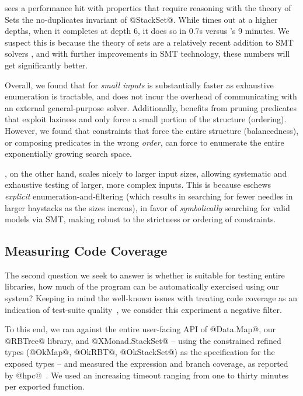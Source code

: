 \toolname sees a performance hit with properties 
that require reasoning with the theory of Sets \eg 
the no-duplicates invariant of @StackSet@. 
%
While \lazysmallcheck times out at a higher depths, when it completes
\eg at depth 6, it does so in 0.7s versus \toolname's 9 minutes.
%
We suspect this is because the theory of sets are a relatively recent
addition to SMT solvers \cite{arrayZ3}, and with further improvements 
in SMT technology, these numbers will get significantly better.


Overall, we found that for \emph{small inputs} \lazysmallcheck 
is substantially faster as exhaustive enumeration is tractable,
and does not incur the overhead of communicating with an external 
general-purpose solver.
%
Additionally, \lazysmallcheck benefits from pruning predicates 
that exploit laziness and only force a small portion of the 
structure (\eg ordering). 
%
However, we found that constraints that force the entire 
structure (\eg balancedness), or composing predicates in the 
wrong \emph{order}, can force \lazysmallcheck to enumerate 
the entire exponentially growing search space.

\toolname, on the other hand, scales nicely to larger input sizes,
allowing systematic and exhaustive testing of larger, more complex
inputs. This is because \toolname eschews \emph{explicit} 
enumeration-and-filtering (which results in searching for 
fewer needles in larger haystacks as the sizes increas), 
in favor of \emph{symbolically} searching for valid models 
via SMT, making \toolname robust to the strictness or ordering 
of constraints.



\subsection{Measuring Code Coverage}\label{sec:code-coverage}

The second question we seek to answer is whether \toolname is suitable for testing entire
libraries, \ie how much of the program can be automatically exercised using our
system? Keeping in mind the well-known issues with treating code coverage as an
indication of test-suite quality~\cite{marick1999misuse}, we
consider this experiment a negative filter.

To this end, we ran \toolname against the entire user-facing API of 
\hbox{@Data.Map@,} our @RBTree@ library, and @XMonad.StackSet@ -- using 
the constrained refined types (\eg @OkMap@, @OkRBT@, @OkStackSet@) as 
the specification for the exposed types -- and measured the expression 
and branch coverage, as reported by @hpc@~\cite{gill2007haskell}.
%
We used an increasing timeout ranging from one to thirty minutes
per exported function.

